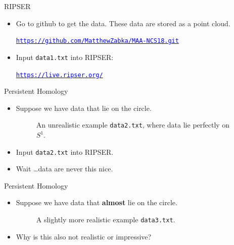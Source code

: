 \begin{frame}{RIPSER}
\begin{center}
\end{center}
\begin{itemize}
\item<1-> Go to github to get the data. These data are stored as a point cloud.
\begin{center}
\hyperref[https://github.com/MatthewZabka/MAA-NCS18.git]{\textcolor{blue}{\texttt{https://github.com/MatthewZabka/MAA-NCS18.git}}}
\end{center}
\item<2-> Input \texttt{data1.txt} into RIPSER:
\begin{center}
\hyperref[https://live.ripser.org/]{\textcolor{blue}{\texttt{https://live.ripser.org/}}}
\end{center}
\end{itemize}
\end{frame}
\begin{frame}{Persistent Homology}
\begin{itemize}
\item<1-> Suppose we have data that lie on the circle.
\begin{center}
\begin{figure}
\caption{An unrealistic example \texttt{data2.txt}, where data lie perfectly on $S^1$.}
\end{figure}
\end{center}
\item<2-> Input \texttt{data2.txt} into RIPSER.
\item<2-> Wait \ldots data are never this nice.
\end{itemize}
\end{frame}
\begin{frame}{Persistent Homology}
\begin{itemize}
\item<1-> Suppose we have data that \textbf{almost} lie on the circle.
\begin{center}
\begin{figure}
\caption{A slightly more realistic example \texttt{data3.txt}.}
\end{figure}
\end{center}
\item<2-> Why is this also not realistic or impressive?
\end{itemize}
\end{frame}
